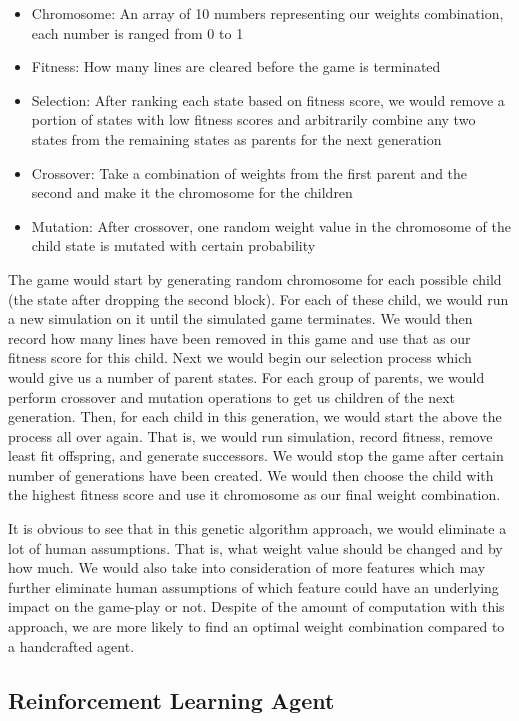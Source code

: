 \documentclass[letterpaper]{article} %
\begin{document}
\begin{itemize}
    \item Chromosome: An array of 10 numbers representing our weights combination, each number is ranged from 0 to 1
    \item Fitness: How many lines are cleared before the game is terminated
    \item Selection: After ranking each state based on fitness score, we would remove a portion of states with low fitness scores and arbitrarily combine any two states from the remaining states as parents for the next generation
    \item Crossover: Take a combination of weights from the first parent and the second and make it the chromosome for the children
    \item Mutation: After crossover, one random weight value in the chromosome of the child state is mutated with certain probability
\end{itemize}

The game would start by generating random chromosome for each possible child (the state after dropping the second block). For each of these child, we would run a new simulation on it until the simulated game terminates. We would then record how many lines have been removed in this game and use that as our fitness score for this child. Next we would begin our selection process which would give us a number of parent states. For each group of parents, we would perform crossover and mutation operations to get us children of the next generation. Then, for each child in this generation, we would start the above the process all over again. That is, we would run simulation, record fitness, remove least fit offspring, and generate successors. We would stop the game after certain number of generations have been created. We would then choose the child with the highest fitness score and use it chromosome as our final weight combination. 

It is obvious to see that in this genetic algorithm approach, we would eliminate a lot of human assumptions. That is, what weight value should be changed and by how much. We would also take into consideration of more features which may further eliminate human assumptions of which feature could have an underlying impact on the game-play or not. Despite of the amount of computation with this approach, we are more likely to find an optimal weight combination compared to a handcrafted agent.


\subsection{Reinforcement Learning Agent}
\end{document}
